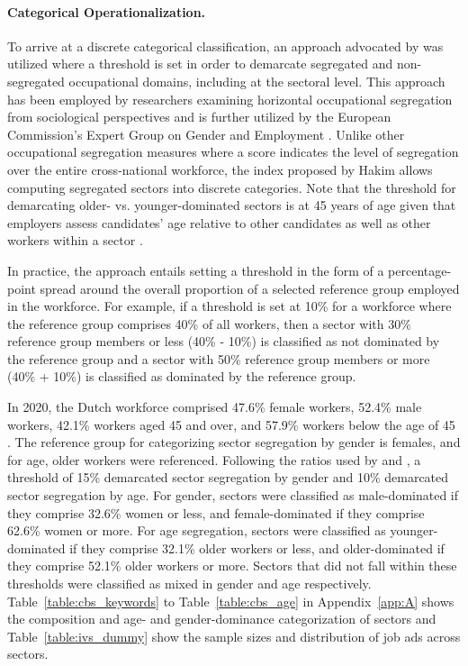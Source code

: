 \documentclass[man]{apa7}
\begin{document}
\paragraph{Categorical Operationalization.}
\label{ivs_dummy_op}
To arrive at a discrete categorical classification, an approach advocated by \Textcite{hakim_segregated_1993} was utilized where a threshold is set in order to demarcate segregated and non-segregated occupational domains, including at the sectoral level. This approach has been employed by researchers examining horizontal occupational segregation from sociological perspectives \parencite[e.g.,][]{jacobs_theoretical_1993, van_der_lippe_comparative_2002} and is further utilized by the European Commission’s Expert Group on Gender and Employment \parencite[EGGE;][]{bettio2009GenderSegregationLabour}. Unlike other occupational segregation measures where a score indicates the level of segregation over the entire cross-national workforce, the index proposed by Hakim allows computing segregated sectors into discrete categories. Note that the threshold for demarcating older- vs. younger-dominated sectors is at 45 years of age given that employers assess candidates’ age relative to other candidates as well as other workers within a sector \parencite{van_selm_search_2021}.

In practice, the approach entails setting a threshold in the form of a percentage-point spread around the overall proportion of a selected reference group employed in the workforce. For example, if a threshold is set at 10\% for a workforce where the reference group comprises 40\% of all workers, then a sector with 30\% reference group members or less (40\% - 10\%) is classified as not dominated by the reference group and a sector with 50\% reference group members or more (40\% + 10\%) is classified as dominated by the reference group.

In 2020, the Dutch workforce comprised 47.6\% female workers, 52.4\% male workers, 42.1\% workers aged 45 and over, and 57.9\% workers below the age of 45 \parencite{centraal_bureau_voor_de_statistiek_sustainable_2019, oecd2020OECDLabourForce}. The reference group for categorizing sector segregation by gender is females, and for age, older workers were referenced. Following the ratios used by \Textcite{hakim_segregated_1993} and \Textcite{bettio2009GenderSegregationLabour}, a threshold of 15\% demarcated sector segregation by gender and 10\% demarcated sector segregation by age. For gender, sectors were classified as male-dominated if they comprise 32.6\% women or less, and female-dominated if they comprise 62.6\% women or more. For age segregation, sectors were classified as younger-dominated if they comprise 32.1\% older workers or less, and older-dominated if they comprise 52.1\% older workers or more. Sectors that did not fall within these thresholds were classified as mixed in gender and age respectively. Table~\ref{table:cbs_keywords} to Table~\ref{table:cbs_age} in Appendix~\ref{app:A} shows the composition and age- and gender-dominance categorization of sectors and Table~\ref{table:ivs_dummy} show the sample sizes and distribution of job ads across sectors.
\end{document}
